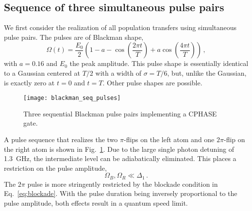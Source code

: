 \subsection{Sequence of three simultaneous pulse pairs}
\label{subsec:RydJZ}

We first consider the realization of all population transfers using simultaneous
pulse pairs. The pulses are of Blackman shape,
\begin{equation}
  \label{eq:blackman}
  \Omega(t) = \frac{E_0}{2}\left(1 - a - \cos\left(\frac{2\pi t}{T}\right)
  + a\cos\left(\frac{4\pi t}{T}\right)\right)\,,
\end{equation}
%
with $a = 0.16$ and $E_0$ the peak amplitude. This pulse shape is essentially
identical to a Gaussian centered at $T/2$ with a width of $\sigma = T/6$, but,
unlike the Gaussian, is exactly zero at $t=0$ and $t=T$. Other pulse shapes are
possible.

\begin{figure}[tb]
    \centering\texttt{[image: blackman\_seq\_pulses]}
  \caption{%
    Three sequential Blackman pulse pairs implementing a CPHASE gate.}
  \label{fig:jz_pulses}
\end{figure}
A pulse sequence that realizes the two $\pi$-flips on the left atom and one
$2\pi$-flip on the right atom is shown in Fig.~\ref{fig:jz_pulses}. Due to the
large single photon detuning of \SI{1.3}{GHz}, the intermediate level can be
adiabatically eliminated. This places a restriction on the pulse amplitude,
\begin{equation}
    \Omega_B, \Omega_R \ll \Delta_1\,.
\end{equation}
%
The $2\pi$ pulse is more stringently restricted by the blockade condition in
Eq.~\eqref{eq:blockade}. With the pulse duration being inversely proportional to
the pulse amplitude, both effects result in a quantum speed limit.

